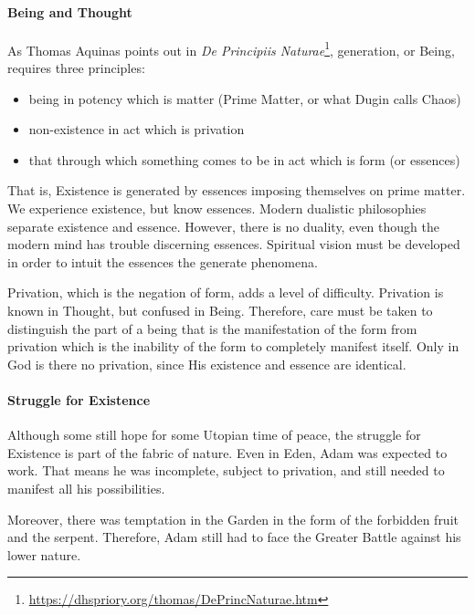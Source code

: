 \paragraph{Being and Thought}


As Thomas Aquinas points out in \emph{De Principiis Naturae}\footnote{\url{https://dhspriory.org/thomas/DePrincNaturae.htm}}, generation, or Being, requires three principles:

\begin{itemize}


\item being in potency which is matter (Prime Matter, or what Dugin calls Chaos)

\item non-existence in act which is privation

\item that through which something comes to be in act which is form (or essences)
\end{itemize}


That is, Existence is generated by essences imposing themselves on prime matter. We experience existence, but know essences. Modern dualistic philosophies separate existence and essence. However, there is no duality, even though the modern mind has trouble discerning essences. Spiritual vision must be developed in order to intuit the essences the generate phenomena.

Privation, which is the negation of form, adds a level of difficulty. Privation is known in Thought, but confused in Being. Therefore, care must be taken to distinguish the part of a being that is the manifestation of the form from privation which is the inability of the form to completely manifest itself. Only in God is there no privation, since His existence and essence are identical.

\paragraph{Struggle for Existence}


Although some still hope for some Utopian time of peace, the struggle for Existence is part of the fabric of nature. Even in Eden, Adam was expected to work. That means he was incomplete, subject to privation, and still needed to manifest all his possibilities.

Moreover, there was temptation in the Garden in the form of the forbidden fruit and the serpent. Therefore, Adam still had to face the Greater Battle against his lower nature.

